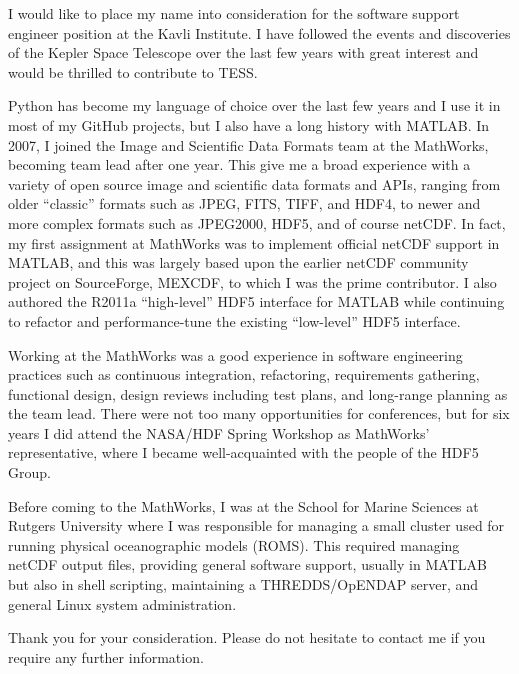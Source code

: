 \documentclass[11pt]{moderncv}  %
\begin{document}

\makelettertitle

I would like to place my name into consideration for the software
support engineer position at the Kavli Institute.  I have followed
the events and discoveries of the Kepler Space Telescope over the
last few years with great interest and would be thrilled to contribute
to TESS.

Python has become my language of choice over the last few years and
I use it in most of my GitHub projects, but I also have a long
history with MATLAB.  In 2007, I joined the Image and Scientific
Data Formats team at the MathWorks, becoming  team lead after one
year.  This give me a broad experience with a variety of open source
image and scientific data formats and APIs, ranging from older
“classic” formats such as JPEG, FITS, TIFF, and HDF4, to newer and
more complex formats such as JPEG2000, HDF5, and of course netCDF.
In fact, my first assignment at MathWorks was to implement official
netCDF support in MATLAB, and this was largely based upon the earlier
netCDF community project on SourceForge, MEXCDF, to which I was the
prime contributor.   I also authored the R2011a “high-level” HDF5
interface for MATLAB while continuing to refactor and performance-tune
the existing “low-level” HDF5 interface.

Working at the MathWorks was a good experience in software engineering
practices such as continuous integration, refactoring, requirements
gathering, functional design, design reviews including test plans,
and long-range planning as the team lead.   There were not too many
opportunities for conferences, but for six years I did attend the
NASA/HDF Spring Workshop as MathWorks’ representative, where I
became well-acquainted with the people of the HDF5 Group.

Before coming to the MathWorks, I was at the School for Marine
Sciences at Rutgers University where I was responsible for managing
a small cluster used for running physical oceanographic models
(ROMS).  This required managing  netCDF output files, providing
general software support, usually in MATLAB but also in shell
scripting, maintaining a THREDDS/OpENDAP server, and general Linux
system administration.

Thank you for your consideration.  Please do not hesitate to contact
me if you require any further information.

\makeletterclosing
\end{document}
